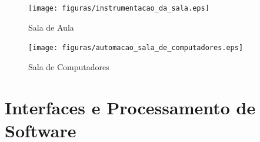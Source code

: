\begin{figure}[!h]
  \centering
  \texttt{[image: figuras/instrumentacao\_da\_sala.eps]}
  \caption{Sala de Aula}
  \label{fig:sala_aula}
\end{figure}

\begin{figure}[!h]
  \centering
  \texttt{[image: figuras/automacao\_sala\_de\_computadores.eps]}
  \caption{Sala de Computadores}
  \label{fig:sala_comp}
\end{figure}

\chapter[Interfaces e Processamento de Software]{Interfaces e Processamento de Software}
